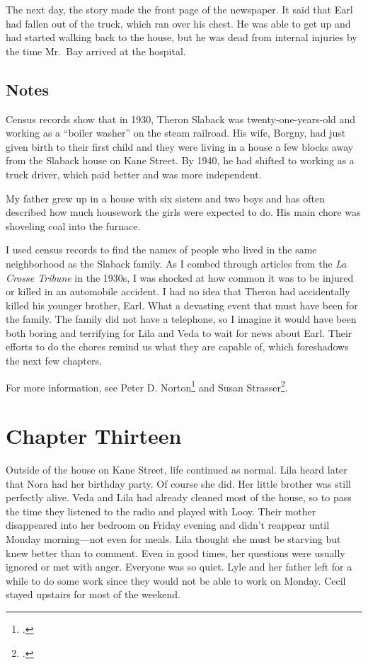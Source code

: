 \documentclass[
  letterpaper,
]{book}
\begin{document}
The next day, the story made the front page of the newspaper. It said
that Earl had fallen out of the truck, which ran over his chest. He was
able to get up and had started walking back to the house, but he was
dead from internal injuries by the time Mr.~Bay arrived at the hospital.

\section{Notes}\label{notes-13}

Census records show that in 1930, Theron Slaback was
twenty-one-years-old and working as a ``boiler washer'' on the steam
railroad. His wife, Borgny, had just given birth to their first child
and they were living in a house a few blocks away from the Slaback house
on Kane Street. By 1940, he had shifted to working as a truck driver,
which paid better and was more independent.

My father grew up in a house with six sisters and two boys and has often
described how much housework the girls were expected to do. His main
chore was shoveling coal into the furnace.

I used census records to find the names of people who lived in the same
neighborhood as the Slaback family. As I combed through articles from
the \emph{La Crosse Tribune} in the 1930s, I was shocked at how common
it was to be injured or killed in an automobile accident. I had no idea
that Theron had accidentally killed his younger brother, Earl. What a
devasting event that must have been for the family. The family did not
have a telephone, so I imagine it would have been both boring and
terrifying for Lila and Veda to wait for news about Earl. Their efforts
to do the chores remind us what they are capable of, which foreshadows
the next few chapters.

For more information, see Peter D. Norton\footnote{.} and Susan Strasser\footnote{.}.


\chapter{Chapter Thirteen}\label{chapter-thirteen}

Outside of the house on Kane Street, life continued as normal. Lila
heard later that Nora had her birthday party. Of course she did. Her
little brother was still perfectly alive. Veda and Lila had already
cleaned most of the house, so to pass the time they listened to the
radio and played with Looy. Their mother disappeared into her bedroom on
Friday evening and didn't reappear until Monday morning---not even for
meals. Lila thought she must be starving but knew better than to
comment. Even in good times, her questions were usually ignored or met
with anger. Everyone was so quiet. Lyle and her father left for a while
to do some work since they would not be able to work on Monday. Cecil
stayed upstairs for most of the weekend.
\end{document}
